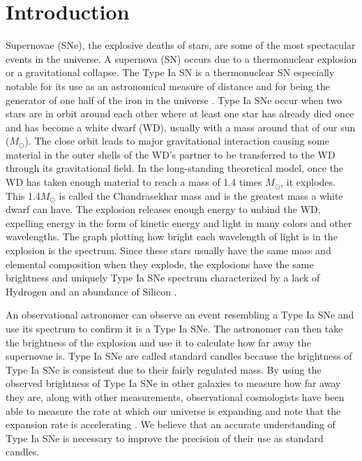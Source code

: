\documentclass[preprint]{aastex62}
\begin{document}
  

\section{Introduction}


  Supernovae (SNe), the explosive deaths of stars, are some of the most spectacular events in the universe. A supernova (SN) occurs due to a thermonuclear explosion or a gravitational collapse. The Type Ia SN is a thermonuclear SN especially notable for its use as an astronomical measure of distance and for being the generator of one half of the iron in the universe \citep{ironhalfuniverse}. Type Ia SNe occur when two stars are in orbit around each other where at least one star has already died once and has become a white dwarf (WD), usually with a mass around that of our sun ($M_{\odot}$). The close orbit leads to major gravitational interaction causing some material in the outer shells of the WD's partner to be transferred to the WD through its gravitational field. In the long-standing theoretical model, once the WD has taken enough material to reach a mass of 1.4 times $M_{\odot}$, it explodes. This 1.4$M_{\odot}$ is called the Chandrasekhar mass and is the greatest mass a white dwarf can have. The explosion releases enough energy to unbind the WD, expelling energy in the form of kinetic energy and light in many colors and other wavelengths. The graph plotting how bright each wavelength of light is in the explosion is the spectrum. Since these stars usually have the same mass and elemental composition when they explode, the explosions have the same brightness and uniquely Type Ia SNe spectrum characterized by a lack of Hydrogen and an abundance of Silicon \citep{SNeSpectra}. 
  
  An observational astronomer can observe an event resembling a Type Ia SNe and use its spectrum to confirm it is a Type Ia SNe. The astronomer can then take the brightness of the explosion and use it to calculate how far away the supernovae is. Type Ia SNe are called standard candles because the brightness of Type Ia SNe is consistent due to their fairly regulated mass. By using the observed brightness of Type Ia SNe in other galaxies to measure how far away they are, along with other measurements, observational cosmologists have been able to measure the rate at which our universe is expanding and note that the expansion rate is accelerating \citep{acceleratingUniverse1, acceleratingUniverse2}. We believe that an accurate understanding of Type Ia SNe is necessary to improve the precision of their use as standard candles. 
  
\end{document}
